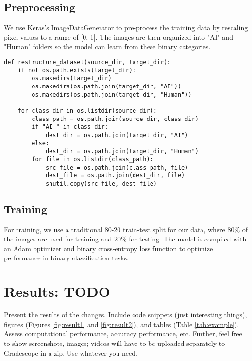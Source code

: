 \subsection{Preprocessing}
\par We use Keras's ImageDataGenerator to pre-process the training data by rescaling pixel values to a range of [0, 1]. The images are then organized into "AI" and "Human" folders so the model can learn from these binary categories.
\begin{lstlisting}[style=Matlab-editor]
def restructure_dataset(source_dir, target_dir):
    if not os.path.exists(target_dir):
        os.makedirs(target_dir)
        os.makedirs(os.path.join(target_dir, "AI"))
        os.makedirs(os.path.join(target_dir, "Human"))

    for class_dir in os.listdir(source_dir):
        class_path = os.path.join(source_dir, class_dir)
        if "AI_" in class_dir:
            dest_dir = os.path.join(target_dir, "AI")
        else:
            dest_dir = os.path.join(target_dir, "Human")
        for file in os.listdir(class_path):
            src_file = os.path.join(class_path, file)
            dest_file = os.path.join(dest_dir, file)
            shutil.copy(src_file, dest_file)
\end{lstlisting}

\subsection{Training}
\par For training, we use a traditional 80-20 train-test split for our data, where 80\% of the images are used for training and 20\% for testing. The model is compiled with an Adam optimizer and binary cross-entropy loss function to optimize performance in binary classification tasks.



\section{Results: TODO}

Present the results of the changes. Include code snippets (just interesting things), figures (Figures \ref{fig:result1} and \ref{fig:result2}), and tables (Table \ref{tab:example}). Assess computational performance, accuracy performance, etc. Further, feel free to show screenshots, images; videos will have to be uploaded separately to Gradescope in a zip. Use whatever you need.




